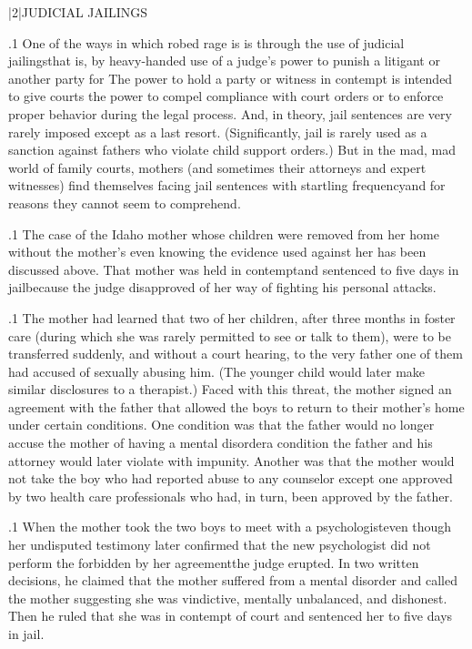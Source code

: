 \documentclass[11pt, twoside]{article}
\begin{document}
{\s|2|{JUDICIAL JAILINGS}

\p.1{%
\noindent{}One of the ways in which robed rage is  is
through the use of judicial jailings\mdash{}that is, by heavy-handed use of a
judge’s power to punish a litigant or another party for  The power to hold a party or witness in contempt is intended
to give courts the power to compel compliance with court orders or to
enforce proper behavior during the legal process. And, in theory, jail
sentences are very rarely imposed except as a last resort. (Significantly,
jail is rarely used as a sanction against fathers who violate child support
orders.) But in the mad, mad world of family courts, mothers (and sometimes their attorneys and expert witnesses) find themselves facing jail
sentences with startling frequency\mdash{}and for reasons they cannot seem
to comprehend.
}%

\p.1{%
The case of the Idaho mother whose children were removed from her
home without the mother's even knowing the evidence used against her
has been discussed above. That mother was held in contempt\mdash{}and
sentenced to five days in jail\mdash{}because the judge disapproved of her way
of fighting his personal attacks.
}%

\p.1{%
The mother had learned that two of her children, after three months
in foster care (during which she was rarely permitted to see or talk to
them), were to be transferred suddenly, and without a court hearing,
to the very father one of them had accused of sexually abusing him.
(The younger child would later make similar disclosures to a therapist.)
Faced with this threat, the mother signed an agreement with the father
that allowed the boys to return to their mother’s home under certain
conditions. One condition was that the father would no longer accuse
the mother of having a mental disorder\mdash{}a condition the father and his
attorney would later violate with impunity. Another was that the mother
would not take the boy who had reported abuse to any counselor except
one approved by two health care professionals who had, in turn, been
approved by the father.
}%

\p.1{%
When the mother took the two boys to meet with
a psychologist\mdash{}even though her undisputed testimony later confirmed that the new
psychologist did not perform the  forbidden by her
agreement\mdash{}the judge erupted. In two written decisions, he claimed
that the mother suffered from a mental disorder and called the mother
 suggesting she was vindictive, mentally unbalanced, and dishonest. Then he ruled that she was in contempt of court
and sentenced her to five days in jail.
}%

}
\end{document}
